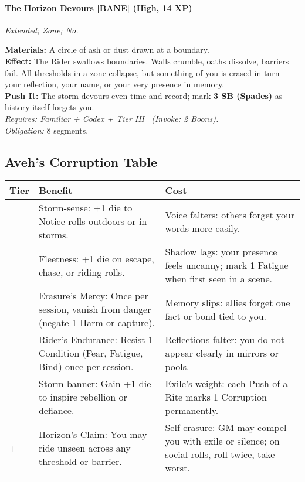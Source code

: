 \paragraph{The Horizon Devours \textnormal{[BANE]} (High, 14 XP)}  
\emph{Extended; Zone; No.}  

\textbf{Materials:} A circle of ash or dust drawn at a boundary.\\
\textbf{Effect:} The Rider swallows boundaries. Walls crumble, oaths dissolve, barriers fail. All thresholds in a zone collapse, but something of you is erased in turn—your reflection, your name, or your very presence in memory.\\
\textbf{Push It:} The storm devours even time and record; mark \textbf{3 SB (Spades)} as history itself forgets you.\\
\emph{Requires: Familiar + Codex + Tier III \ (\textit{Invoke:} 2 Boons).}\\
\emph{Obligation:} 8 segments.

\subsection*{Aveh’s Corruption Table}
\label{sec:aveh-corruption}

\begin{longtable}{>{\raggedright\arraybackslash}p{1cm} p{5cm} p{5cm}}
\toprule
\textbf{Tier} & \textbf{Benefit} & \textbf{Cost} \\
\midrule
1 & Storm-sense: +1 die to Notice rolls outdoors or in storms. & Voice falters: others forget your words more easily. \\
\midrule
2 & Fleetness: +1 die on escape, chase, or riding rolls. & Shadow lags: your presence feels uncanny; mark 1 Fatigue when first seen in a scene. \\
\midrule
3 & Erasure’s Mercy: Once per session, vanish from danger (negate 1 Harm or capture). & Memory slips: allies forget one fact or bond tied to you. \\
\midrule
4 & Rider’s Endurance: Resist 1 Condition (Fear, Fatigue, Bind) once per session. & Reflections falter: you do not appear clearly in mirrors or pools. \\
\midrule
5 & Storm-banner: Gain +1 die to inspire rebellion or defiance. & Exile’s weight: each Push of a Rite marks 1 Corruption permanently. \\
\midrule
6+ & Horizon’s Claim: You may ride unseen across any threshold or barrier. & Self-erasure: GM may compel you with exile or silence; on social rolls, roll twice, take worst. \\
\bottomrule
\end{longtable}